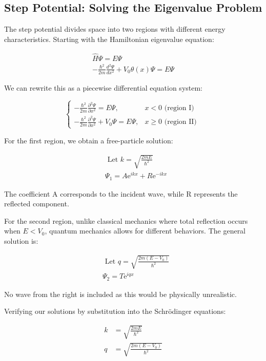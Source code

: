 \documentclass[italian]{HKNdocument}
\begin{document}
\subsection{Step Potential: Solving the Eigenvalue Problem}

The step potential divides space into two regions with different energy characteristics. Starting with the Hamiltonian eigenvalue equation:

\begin{gather}
\hat{H} \Psi=E \Psi  \label{eq:6.8}\\
-\frac{\hbar^{2}}{2 m} \frac{d^{2} \Psi}{d x^{2}}+V_{0} \theta(x) \Psi=E \Psi \label{eq:6.9}
\end{gather}

We can rewrite this as a piecewise differential equation system:

\[
\begin{cases}-\frac{\hbar^{2}}{2 m} \frac{\partial^{2} \Psi}{\partial x^{2}}=E \Psi, & x<0 \text { (region I) }  \label{eq:6.10}\\ -\frac{\hbar^{2}}{2 m} \frac{\partial^{2} \Psi}{\partial x^{2}}+V_{0} \Psi=E \Psi, & x \geq 0 \text { (region II) }\end{cases}
\]

For the first region, we obtain a free-particle solution:

\begin{align}
& \text { Let } k=\sqrt{\frac{2 m E}{\hbar^{2}}}  \label{eq:6.11}\\
& \Psi_{1}=A \mathrm{e}^{i k x}+R \mathrm{e}^{-i k x}
\end{align}

The coefficient A corresponds to the incident wave, while R represents the reflected component.

For the second region, unlike classical mechanics where total reflection occurs when $E < V_0$, quantum mechanics allows for different behaviors. The general solution is:

\begin{align}
& \text { Let } q=\sqrt{\frac{2 m\left(E-V_{0}\right)}{\hbar^{2}}}  \label{eq:6.12}\\
& \Psi_{2}=T \mathrm{e}^{i q x}
\end{align}

No wave from the right is included as this would be physically unrealistic.

Verifying our solutions by substitution into the Schrödinger equations:

\begin{align}
k & =\sqrt{\frac{2 m E}{\hbar^{2}}}  \label{eq:6.13}\\
q & =\sqrt{\frac{2 m\left(E-V_{0}\right)}{\hbar^{2}}}
\end{align}
\end{document}
